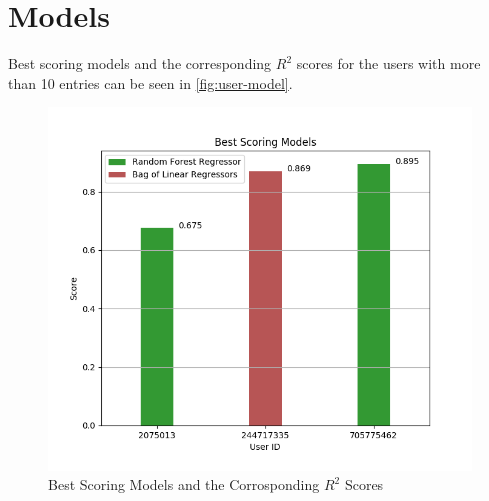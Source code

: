 \newpage
\section{Models}
Best scoring models and the corresponding $R^2$ scores for the users with more than 10 entries can be seen in \autoref{fig:user-model}.
\begin{figure}[htbp]
  \centering
  \captionsetup{width=.9\linewidth}
  \includegraphics[scale=0.6]{figures/user-model}
  \caption{Best Scoring Models and the Corrosponding $R^2$ Scores}
  \label{fig:user-model}
\end{figure}


